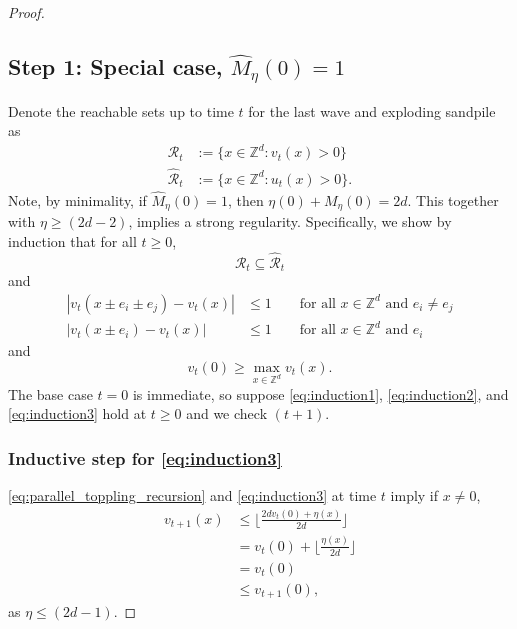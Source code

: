 \documentclass[aap]{imsart}
\newcommand{\Z}{\mathbb{Z}}
\begin{document}
\begin{proof}
	\subsection*{Step 1: Special case,  \texorpdfstring{$\hat{M}_{\eta}(0) = 1$}{One firing} }
	Denote the reachable sets up to time $t$ for the last wave and exploding sandpile as 
	\begin{equation} \label{eq:reachablesets_definition}
	\begin{aligned}
	\mathcal{R}_t &:= \{ x \in \Z^d : v_t(x) > 0 \} \\
	\hat{\mathcal{R}}_t &:= \{ x \in \Z^d : u_t(x) > 0 \}.
	\end{aligned}
	\end{equation}
	Note, by minimality, if $\hat{M}_{\eta}(0) = 1$, then $\eta(0) + M_{\eta}(0) = 2 d$. 
	This together with $\eta \geq (2 d- 2)$, implies a strong regularity. 
	Specifically, we show by induction that for all $t \geq 0$,
	\begin{equation} \label{eq:induction1}
	\mathcal{R}_t \subseteq \hat{\mathcal{R}}_t 
	\end{equation}
	and 
	\begin{equation} \label{eq:induction2}
	\begin{aligned}
	|v_t(x \pm e_i \pm e_j) - v_t(x)| &\leq 1  \qquad \mbox{for all $x \in \Z^d$ and $e_i \not = e_j$} \\
	|v_t(x \pm e_i) - v_t(x)| &\leq 1   \qquad \mbox{for all $x \in \Z^d$ and $e_i$}
	\end{aligned}
	\end{equation}
	and 
	\begin{equation} \label{eq:induction3}
	v_t(0) \geq \max_{x \in \Z^d} v_t(x).
	\end{equation}
	The base case $t = 0$ is immediate, so suppose \eqref{eq:induction1}, \eqref{eq:induction2}, and \eqref{eq:induction3}
	hold at $t \geq 0$ and we check $(t+1)$.  
	\subsubsection*{Inductive step for \eqref{eq:induction3}}
	\eqref{eq:parallel_toppling_recursion} and \eqref{eq:induction3} at time $t$ imply
	if $x \not = 0$, 
	\begin{align*}
	v_{t+1}(x) &\leq \lfloor \frac{2 d  v_t(0) + \eta(x) }{2 d} \rfloor \\
	&= v_t(0) + \lfloor \frac{\eta(x)}{2 d} \rfloor \\
	&= v_t(0) \\
	&\leq v_{t+1}(0),
	\end{align*}
	as $\eta \leq (2 d - 1)$. 
	

\end{proof}
\end{document}
